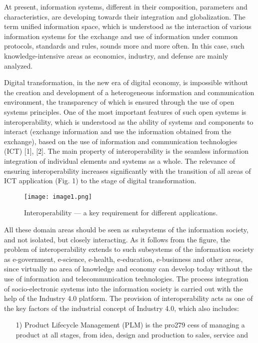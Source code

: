 \documentclass[10pt, a4paper]{article}
\begin{document}
\begin{multicols}{2}
At present, information systems, different in their composition, parameters and characteristics, are developing
towards their integration and globalization. The term
unified information space, which is understood as the
interaction of various information systems for the exchange and use of information under common protocols,
standards and rules, sounds more and more often. In
this case, such knowledge-intensive areas as economics,
industry, and defense are mainly analyzed.
\par
Digital transformation, in the new era of digital economy, is impossible without the creation and development
of a heterogeneous information and communication environment, the transparency of which is ensured through
the use of open systems principles. One of the most
important features of such open systems is interoperability, which is understood as the ability of systems and
components to interact (exchange information and use
the information obtained from the exchange), based on
the use of information and communication technologies
(ICT) [1], [2]. The main property of interoperability
is the seamless information integration of individual
elements and systems as a whole. The relevance of
ensuring interoperability increases significantly with the
transition of all areas of ICT application (Fig. 1) to the
stage of digital transformation.
\begin{figure}[H]
  \texttt{[image: image1.png]}
  \caption{Interoperability — a key requirement for different applications.}
\end{figure}
\par
All these domain areas should be seen as subsystems
of the information society, and not isolated, but closely
interacting. As it follows from the figure, the problem
of interoperability extends to such subsystems of the
information society as e-government, e-science, e-health,
e-education, e-businness and other areas, since virtually
no area of knowledge and economy can develop today
without the use of information and telecommunication
technologies. The process integration of socio-electronic
systems into the information society is carried out with
the help of the Industry 4.0 platform. The provision of
interoperability acts as one of the key factors of the
industrial concept of Industry 4.0, which also includes:
\begin{enumerate}
\item[1)]  Product Lifecycle Management (PLM) is the pro279
cess of managing a product at all stages, from
idea, design and production to sales, service and

\end{enumerate}
\end{multicols}
\end{document}

